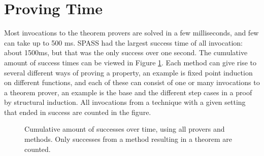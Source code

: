 \begin{comment}
The two files \ts{Nat} and \ts{ZenoLists} are taken from the Zeno test
suite \citep{zeno}. Zeno accomplishes to prove all but two properties,
and the situation is a bit different here. If the theorems and finite
theorems are summed, the result is 26/33 for \ts{Nat} and 36/54 for
\ts{ZenoLists}. The explanation is simple, our tool neither use nor
discover lemmas, whereas Zeno can. A similar result can be found in
the test suite file \ts{ProductiveUseOfFailure} from the paper with
the same name \citep{productiveuse}. The tests from that paper
includes the lemmas discovered by their tool, and most of the theorems
we can prove are those lemmas. Lemmas are crucial in many files,
examples are \ts{InsertionSort} and \ts{Reverse}. It is also needed to
prove more sophisticated properties not widely included in this test
suite.

\end{comment}


\section{Proving Time}

Most invocations to the theorem provers are solved in a few
milliseconds, and few can take up to 500 ms. SPASS had the largest
success time of all invocation: about 1500ms, but that was the only
success over one second. The cumulative amount of success times can be
viewed in Figure \ref{fig:provingtime}. Each method can give rise to
several different ways of proving a property, an example is fixed
point induction on different functions, and each of these can consist
of one or many invocations to a theorem prover, an example is the base
and the different step cases in a proof by structural induction.  All
invocations from a technique with a given setting that ended in
success are counted in the figure.


\begin{figure}[h]
\centering
{}
\caption{Cumulative amount of successes over time, using all provers
  and methods. Only successes from a method resulting in a theorem are counted.
\label{fig:provingtime}
}
\end{figure}

